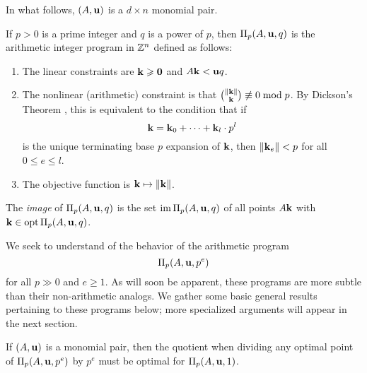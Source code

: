 \documentclass[11pt]{amsart}
\begin{document}
In what follows, $(A, \mathbf{u})$ is a $d \times n$ monomial pair.


\begin{definition} 
\label{aip: D}
If $p>0$ is a prime integer and $q$ is a power of $p$, then $\Pi_p(A, \mathbf{u}, q)$ is the arithmetic integer program in $\mathbb{Z}^n$ defined as follows:
\begin{enumerate}
\item The linear constraints are $\mathbf{k} \geqslant \mathbf{0}$ and $A \mathbf{k} < \mathbf{u}q$.  
\item The nonlinear (arithmetic) constraint is that $\binom{\| \mathbf{k} \|}{\mathbf{k}} \not \equiv 0 \bmod p$.
By Dickson's Theorem \cite{dickson.multinomial}, this is equivalent to the condition that  if \[ \mathbf{k} = \mathbf{k}_0 + \cdots + \mathbf{k}_l \cdot  p^l\] is the unique terminating base $p$ expansion of $\mathbf{k}$, then $\| \mathbf{k}_e \| < p$ for all $0 \leq e \leq l $.
\item The objective function is $\mathbf{k} \mapsto \| \mathbf{k} \|$.
\end{enumerate}

\end{definition}



\begin{definition}
The \emph{image} of $\Pi_p(A, \mathbf{u}, q)$ is the set $\operatorname{im} \Pi_p(A, \mathbf{u}, q)$ of all points  $A \mathbf{k}$ with $\mathbf{k} \in \operatorname{opt} \Pi_p(A, \mathbf{u}, q)$. 
\end{definition}

We seek to understand of the behavior of the arithmetic program \[ \Pi_p(A, \mathbf{u}, p^e)\] for all $p \gg 0$ and $e \geq 1$.    As will soon be apparent, these programs are more subtle than their non-arithmetic analogs.  We gather some basic general results pertaining to these programs below;  more specialized arguments will appear in the next section.

\begin{lemma} 
\label{optimal division: L}  If $(A, \mathbf{u})$ is a monomial pair, then the quotient when dividing any optimal point of $\Pi_p(A, \mathbf{u}, p^e)$ by $p^e$ must be optimal for $\Pi_p(A, \mathbf{u}, 1)$.
\end{lemma}
\end{document}

